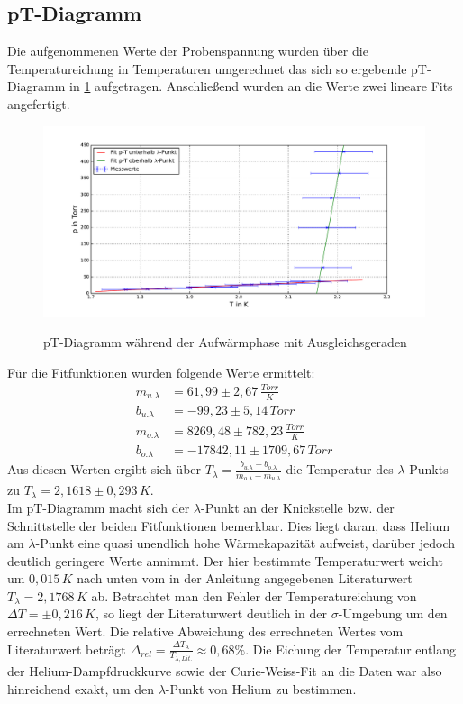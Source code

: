 \documentclass[twoside,colorback,accentcolor=tud4c,11pt]{tudreport}
\begin{document}
\subsection{pT-Diagramm}
Die aufgenommenen Werte der Probenspannung wurden über die Temperatureichung in Temperaturen umgerechnet das sich so ergebende pT-Diagramm in \ref{pTdia} aufgetragen. Anschließend wurden an die Werte zwei lineare Fits angefertigt.
\begin{figure}[H]
\centering
   	\begin{minipage}[b]{1.0\textwidth}
   	\includegraphics[width=\textwidth]{graphics/pT.pdf}
  	\label{pTdia}
   	\end{minipage}
\caption{pT-Diagramm während der Aufwärmphase mit Ausgleichsgeraden}	
\end{figure}
Für die Fitfunktionen wurden folgende Werte ermittelt:
\begin{align}
m_{u.\lambda}&=61,99\pm 2,67 \,\si{\frac{Torr}{K}}\\
b_{u.\lambda}&=-99,23\pm 5,14\,\si{Torr}\\
m_{o.\lambda}&=8269,48\pm 782,23 \,\si{\frac{Torr}{K}}\\
b_{o.\lambda}&=-17842,11\pm 1709,67\,\si{Torr}
\end{align}
Aus diesen Werten ergibt sich über $T_{\lambda}=\frac{b_{u.\lambda}-b_{o.\lambda}}{m_{o.\lambda}-m_{u.\lambda}}$ die Temperatur des $\lambda$-Punkts zu $T_{\lambda}=2,1618\pm 0,293\,\si{K}$.\\
Im pT-Diagramm macht sich der $\lambda$-Punkt an der Knickstelle bzw. der Schnittstelle der beiden Fitfunktionen bemerkbar. Dies liegt daran, dass Helium am $\lambda$-Punkt eine quasi unendlich hohe Wärmekapazität aufweist, darüber jedoch deutlich geringere Werte annimmt. Der hier bestimmte Temperaturwert  weicht um $0,015\,\si{K}$ nach unten vom in der Anleitung angegebenen Literaturwert $T_{\lambda}=2,1768\,\si{K}$ ab. Betrachtet man den Fehler der Temperatureichung von $\Delta T=\pm 0,216\,\si{K}$, so liegt der Literaturwert deutlich in der $\sigma$-Umgebung um den errechneten Wert. Die relative Abweichung des errechneten Wertes vom Literaturwert beträgt $\Delta_{rel}=\frac{\Delta T_{\lambda}}{T_{\lambda ,Lit.}}\approx 0,68\%.$ Die Eichung der Temperatur entlang der Helium-Dampfdruckkurve sowie der Curie-Weiss-Fit an die Daten war also hinreichend exakt, um den $\lambda$-Punkt von Helium zu bestimmen.
\end{document}
